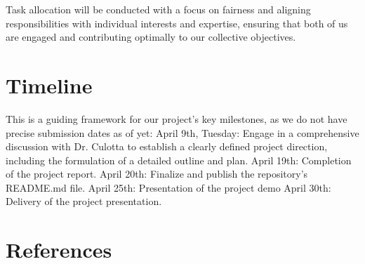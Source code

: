 \documentclass[11pt,a4paper]{article}
\begin{document}
Task allocation will be conducted with a focus on fairness and aligning responsibilities with individual interests and expertise, ensuring that both of us are engaged and contributing optimally to our collective objectives. 

\section{Timeline}
This is a guiding framework for our project's key milestones, as we do not have  precise submission dates as of yet:  
April 9th, Tuesday: Engage in a comprehensive discussion with Dr. Culotta to establish a clearly defined project direction, including the formulation of a detailed outline and plan.  
April 19th: Completion of the project report.  
April 20th: Finalize and publish the repository's README.md file. 
April 25th: Presentation of the project demo 
April 30th: Delivery of the project presentation. 

\section{References}



\nocite{mitchell2023detectgpt}
\nocite{bakhtin2020realorfake}
\nocite{mitrovic2023chatgpt}
\nocite{he2023mgtbench}
\end{document}

